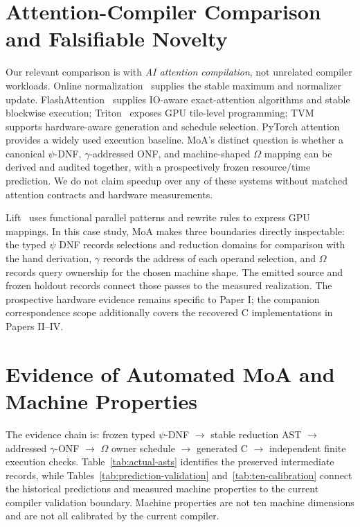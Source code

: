 \documentclass[sigplan,10pt,review,anonymous,balance=false,pbalance=false]{acmart}
\begin{document}
\section{Attention-Compiler Comparison and Falsifiable Novelty}
\label{sec:fair-comparison}
Our relevant comparison is with \emph{AI attention compilation}, not unrelated compiler workloads. Online normalization~\cite{online} supplies the stable maximum and normalizer update. FlashAttention~\cite{flash,flash2} supplies IO-aware exact-attention algorithms and stable blockwise execution; Triton~\cite{triton} exposes GPU tile-level programming; TVM~\cite{tvm} supports hardware-aware generation and schedule selection. PyTorch attention provides a widely used execution baseline. MoA's distinct question is whether a canonical $\psi$-DNF, $\gamma$-addressed ONF, and machine-shaped $\Omega$ mapping can be derived and audited together, with a prospectively frozen resource/time prediction. We do not claim speedup over any of these systems without matched attention contracts and hardware measurements.

Lift~\cite{lift} uses functional parallel patterns and rewrite rules to express GPU mappings. In this case study, MoA makes three boundaries directly inspectable: the typed $\psi$ DNF records selections and reduction domains for comparison with the hand derivation, $\gamma$ records the address of each operand selection, and $\Omega$ records query ownership for the chosen machine shape. The emitted source and frozen holdout records connect those passes to the measured realization. The prospective hardware evidence remains specific to Paper I; the companion correspondence scope additionally covers the recovered C implementations in Papers II--IV.

\section{Evidence of Automated MoA and Machine Properties}
\label{sec:evidence-matrix}
The evidence chain is: frozen typed $\psi$-DNF $\rightarrow$ stable reduction AST $\rightarrow$ addressed $\gamma$-ONF $\rightarrow$ $\Omega$ owner schedule $\rightarrow$ generated C $\rightarrow$ independent finite execution checks. Table~\ref{tab:actual-asts} identifies the preserved intermediate records, while Tables~\ref{tab:prediction-validation} and~\ref{tab:ten-calibration} connect the historical predictions and measured machine properties to the current compiler validation boundary. Machine properties are not ten machine dimensions and are not all calibrated by the current compiler.
\end{document}
